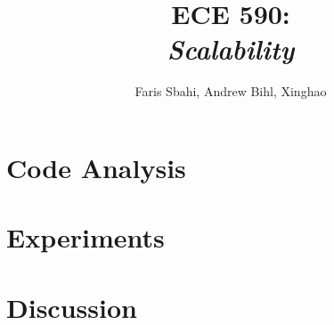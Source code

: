 \documentclass[titlepage, 11pt]{article}
\title{ECE 590: \\\textit{Scalability}}
\author{Faris Sbahi, Andrew Bihl, Xinghao}
\newcommand\0{\mathbf{0}}
\newcommand\<{\langle}
\renewcommand\>{\rangle}
\begin{document}
\maketitle

\section{Code Analysis}

\section{Experiments}

\section{Discussion}
\end{document}
